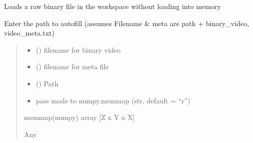 \documentclass[letterpaper,10pt,english]{sphinxmanual}
\begin{document}

\begin{fulllineitems}
\label{\detokenize{IO:IO.load_mapped_binary}}
\pysigstartsignatures
{}
\pysigstopsignatures
\sphinxAtStartPar
Loads a raw binary file in the workspace without loading into memory

\sphinxAtStartPar
Enter the path to autofill (assumes Filename \& meta are path + binary\_video, video\_meta.txt)
\begin{quote}\begin{description}
\begin{itemize}
\item {} 
\sphinxAtStartPar
{} () \textendash{} filename for binary video

\item {} 
\sphinxAtStartPar
{} () \textendash{} filename for meta file

\item {} 
\sphinxAtStartPar
{} () \textendash{} Path

\item {} 
\sphinxAtStartPar
{} \textendash{} pass mode to numpy.memmap (str, default = “r”)

\end{itemize}

\sphinxAtStartPar
memmap(numpy) array {[}Z x Y x X{]}

\sphinxAtStartPar
Any

\end{description}\end{quote}

\end{fulllineitems}
\end{document}
